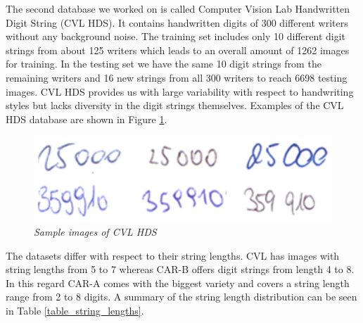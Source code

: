 The second database we worked on is called Computer Vision Lab Handwritten Digit String (CVL HDS). It contains handwritten digits of 300 different writers without any background noise. The training set includes only 10 different digit strings from about 125 writers which leads to an overall amount of 1262 images for training. In the testing set we have the same 10 digit strings from the remaining writers and 16 new strings from all 300 writers to reach 6698 testing images. CVL HDS provides us with large variability with respect to handwriting styles but lacks diversity in the digit strings themselves. Examples of the CVL HDS database are shown in Figure \ref{fig:cvl}.

\begin{figure}
  \includegraphics[width=\linewidth]{images/CVL-HDS-Splitted.png}
  \caption{\it Sample images of CVL HDS}
  \label{fig:cvl}
\end{figure}

The datasets differ with respect to their string lengths. CVL has images with string lengths from 5 to 7 whereas CAR-B offers digit strings from length 4 to 8. In this regard CAR-A comes with the biggest variety and covers a string length range from 2 to 8 digits. A summary of the string length distribution can be seen in Table \ref{table_string_lengths}.

